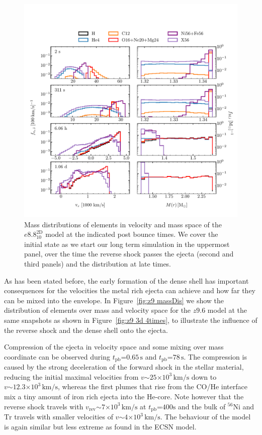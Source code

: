 \documentclass[fleqn,usenatbib]{mnras}
\newcommand{\nickel}{\ensuremath{\mathrm{^{56}Ni}}\xspace}
\newcommand{\tracer}{\ensuremath{\mathrm{Tr}}\xspace}
\newcommand{\s}{\ensuremath{\text{s}}}
\begin{document}
\begin{figure}
 \centering
 \includegraphics[width=\textwidth,trim=0cm 0.6cm 0cm 1cm, clip]{pic/e8_2d_10_massDis_mvr_mas_4times_paper.pdf}
 \caption{Mass distributions of elements in velocity and mass space  of the $e8.8^{\mathrm{2D}}_{10}$ model at the indicated post bounce times. We cover the initial state as we start our long term simulation in the uppermost panel, over the time the reverse shock passes the ejecta (second and third panels) and the distribution at late times.}
 \label{fig:e8 massDis 4times}
\end{figure}
As has been stated before, the early formation of the dense shell has important consequences for the velocities the metal rich ejecta can achieve and how far they can be mixed into the envelope.
In Figure~\ref{fig:z9 massDis} we show the distribution of elements over mass and velocity space for the $z9.6$ model at the same snapshots as shown in Figure~\ref{fig:z9 3d  4times}, to illustrate the influence of the reverse shock and the dense shell onto the ejecta.

Compression of the ejecta in velocity space and some mixing over mass coordinate can be observed during $t_{\mathrm{pb}}\mathord{=}0.65\,\s$ and $t_{\mathrm{pb}}\mathord{=}78\,\s$. The compression is caused by the strong deceleration of the forward shock in the stellar material, reducing the initial maximal velocities from $v\mathord{\sim} 25\mathord{\times}10^3\,\mathrm{km/s}$ down to $v\mathord{\sim} 12.3\mathord{\times}10^3\,\mathrm{km/s}$, whereas the first plumes that rise from the CO/He interface mix a tiny amount of iron rich ejecta into the He-core. Note however that the reverse shock travels with $v_{\mathrm{rev}}\mathord{\sim} 7\mathord{\times}10^3\,\mathrm{km/s}$ at $t_{\mathrm{pb}}\mathord{=}400\s$ and the bulk of $\nickel$ and $\tracer$ travels with smaller velocities of $v\mathord{\sim} 4\mathord{\times}10^3\,\mathrm{km/s}$. The behaviour of the model is again similar but less extreme as found in the ECSN model.
\end{document}
